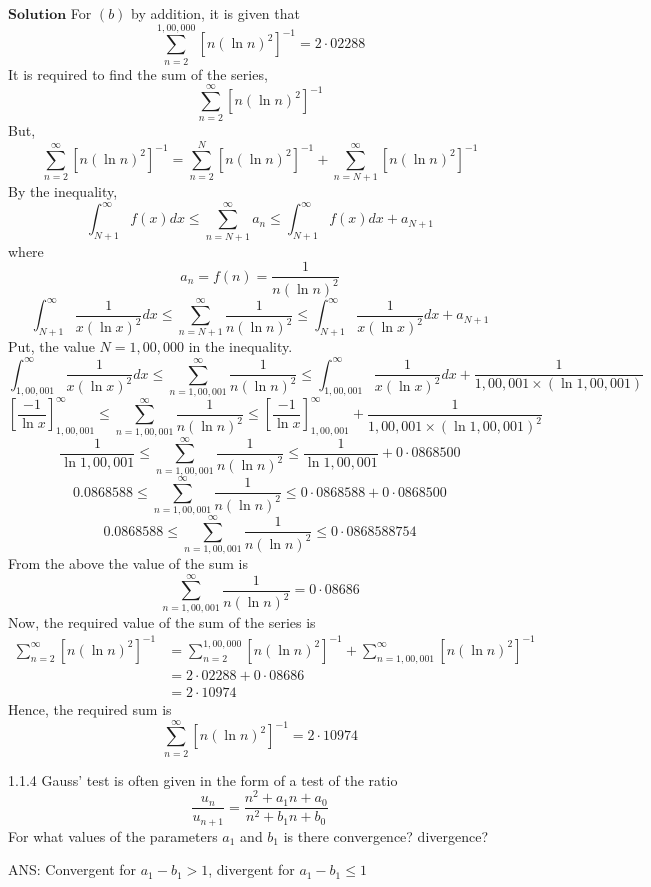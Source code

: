 $\boxed{\textbf{Solution}}$ For $(b)$ by addition, it is given that 
$$\sum_{n=2}^{1,00,000}\left[n(\ln n)^{2}\right]^{-1}=2 \cdot 02288$$
It is required to find the sum of the series, 
$$\sum_{n=2}^{\infty}\left[n(\ln n)^{2}\right]^{-1}$$
But, 
$$\sum_{n=2}^{\infty}\left[n(\ln n)^{2}\right]^{-1}=\sum_{n=2}^{N}\left[n(\ln n)^{2}\right]^{-1}+\sum_{n=N+1}^{\infty}\left[n(\ln n)^{2}\right]^{-1}$$
By the inequality, 
$$\int_{N+1}^{\infty} f(x) d x \leq \sum_{n=N+1}^{\infty} a_{n} \leq \int_{N+1}^{\infty} f(x) d x+a_{N+1}$$ 
where 
$$a_{n}=f(n)=\frac{1}{n(\ln n)^{2}}$$
$$
\int_{N+1}^{\infty} \frac{1}{x(\ln x)^{2}} d x \leq \sum_{n=N+1}^{\infty} \frac{1}{n(\ln n)^{2}} \leq \int_{N+1}^{\infty} \frac{1}{x(\ln x)^{2}} d x+a_{N+1}
$$
Put, the value $N=1,00,000$ in the inequality.
$$
\int_{1,00,001}^{\infty} \frac{1}{x(\ln x)^{2}} d x \leq \sum_{n=1,00,001}^{\infty} \frac{1}{n(\ln n)^{2}} \leq \int_{1,00,001}^{\infty} \frac{1}{x(\ln x)^{2}} d x+\frac{1}{1,00,001 \times(\ln 1,00,001)}
$$
$$
\left[\frac{-1}{\ln x}\right]_{1,00,001}^{\infty} \leq \sum_{n=1,00,001}^{\infty} \frac{1}{n(\ln n)^{2}} \leq\left[\frac{-1}{\ln x}\right]_{1,00,001}^{\infty}+\frac{1}{1,00,001 \times(\ln 1,00,001)^{2}}
$$
$$
\frac{1}{\ln 1,00,001} \leq \sum_{n=1,00,001}^{\infty} \frac{1}{n(\ln n)^{2}} \leq \frac{1}{\ln 1,00,001}+0 \cdot 0868500
$$
$$
0.0868588 \leq \sum_{n=1,00,001}^{\infty} \frac{1}{n(\ln n)^{2}} \leq 0 \cdot 0868588+0 \cdot 0868500
$$
$$
0.0868588\leq \sum_{n=1,00,001}^{\infty} \frac{1}{n(\ln n)^{2}} \leq 0 \cdot 0868588754
$$
From the above the value of the sum is 
$$\sum_{n=1,00,001}^{\infty} \frac{1}{n(\ln n)^{2}}=0 \cdot 08686$$
Now, the required value of the sum of the series is
$$
\begin{aligned}
\sum_{n=2}^{\infty}\left[n(\ln n)^{2}\right]^{-1} &=\sum_{n=2}^{1,00,000}\left[n(\ln n)^{2}\right]^{-1}+\sum_{n=1,00,001}^{\infty}\left[n(\ln n)^{2}\right]^{-1} \\
&=2 \cdot 02288+0 \cdot 08686 \\
&=2 \cdot 10974
\end{aligned}
$$
Hence, the required sum is 
$$\sum_{n=2}^{\infty}\left[n(\ln n)^{2}\right]^{-1}=2 \cdot 10974$$


\newpage


\begin{mybox}{1.1.4}
Gauss' test is often given in the form of a test of the ratio
$$
\frac{u_{n}}{u_{n+1}}=\frac{n^{2}+a_{1} n+a_{0}}{n^{2}+b_{1} n+b_{0}}
$$
For what values of the parameters $a_{1}$ and $b_{1}$ is there convergence? divergence?

ANS: Convergent for $a_{1}-b_{1}>1$, divergent for $a_{1}-b_{1} \leq 1$
\end{mybox}




